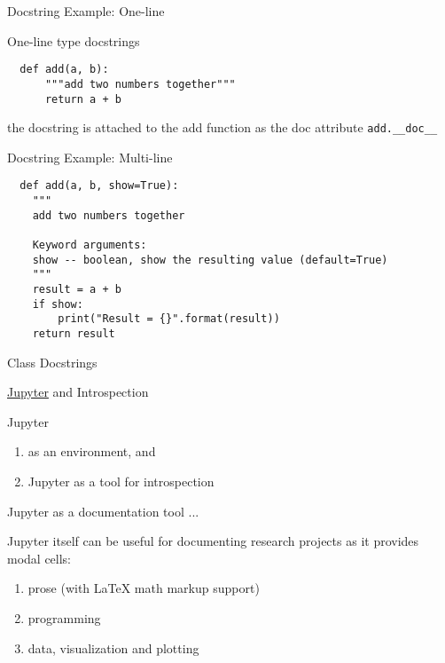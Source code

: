 \documentclass{beamer}
\begin{document}
\begin{frame}[fragile]{Docstring Example: One-line}

  One-line type docstrings

  \begin{verbatim}
  def add(a, b):
      """add two numbers together"""
      return a + b
  \end{verbatim}

the docstring is attached to the add function as the doc attribute \texttt{add.__doc__}

\end{frame}

\begin{frame}[fragile]{Docstring Example: Multi-line}

  \begin{verbatim}
  def add(a, b, show=True):
    """
    add two numbers together

    Keyword arguments:
    show -- boolean, show the resulting value (default=True)
    """
    result = a + b 
    if show: 
        print("Result = {}".format(result))
    return result
  \end{verbatim}

\end{frame}


\begin{frame}{Class Docstrings}

\end{frame}


\begin{frame}{\href{http://jupyter.org/}{Jupyter} and Introspection}

Jupyter

\begin{enumerate}
  \item as an environment, and 
  \item Jupyter as a tool for introspection
\end{enumerate}

\end{frame}

\begin{frame}{Jupyter as a documentation tool ...}

Jupyter itself can be useful for documenting research projects as it provides modal cells:

\begin{enumerate}
  \item prose (with LaTeX math markup support)
  \item programming
  \item data, visualization and plotting
\end{enumerate}

\end{frame}
\end{document}
